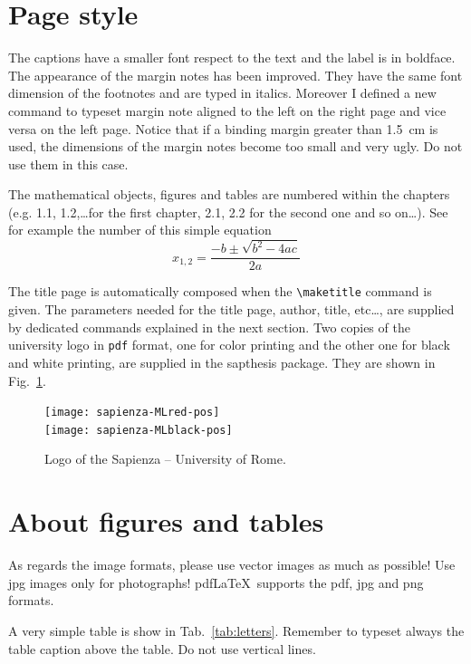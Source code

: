 \documentclass[LaM,binding=0.6cm]{sapthesis}
\newcommand{\bs}{\textbackslash}
\begin{document}
\section{Page style}

The captions have a smaller font respect to the text and the label is in boldface. The appearance of the margin notes has been improved.
They have the same font dimension of the footnotes and are typed in italics.
Moreover I defined a new command to typeset margin note aligned to the left on the right page and vice versa on the left page.
Notice that if a binding margin greater than 1.5\, cm is used, the dimensions of the margin notes become too small and very ugly.
Do not use them in this case.

The mathematical objects, figures and tables are numbered within the chapters (e.g. 1.1, 1.2,\ldots for the first chapter, 2.1, 2.2 for the second one and so on\ldots). See for example the number of this simple equation
\begin{equation}
x_{1,2}=\frac{-b\pm\sqrt{b^2-4ac}}{2a}
\end{equation}


The title page is automatically composed when the \texttt{\bs maketitle} command is given.
The parameters needed for the title page, author, title, etc\ldots , are supplied by dedicated commands explained in the next section.
Two copies of the university logo in \texttt{pdf} format, one for color printing and the other one for black and white printing, are supplied in the \textsf{sapthesis} package. They are shown in Fig.~\ref{fig:largenenough}.

\begin{figure}
\centering
\texttt{[image: sapienza-MLred-pos]}\\[3ex]
\texttt{[image: sapienza-MLblack-pos]}
\caption{Logo of the Sapienza -- University of Rome.}
\label{fig:largenenough}
\end{figure}



\section{About figures and tables}

As regards the image formats, please use vector images as much as possible! Use jpg images only for photographs! pdf\LaTeX\ supports the pdf, jpg and png formats.

A very simple table is show in Tab.~\ref{tab:letters}. Remember to typeset
always the table caption above the table. Do not use vertical lines.
\end{document}
